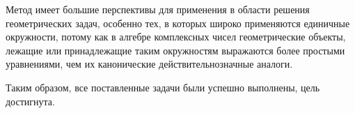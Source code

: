 Метод имеет большие перспективы для применения в области решения геометрических
задач, особенно тех, в которых широко применяются единичные окружности, потому как в алгебре
комплексных чисел геометрические объекты, лежащие или принадлежащие таким окружностям выражаются
более простыми уравнениями, чем их канонические действительнозначные аналоги.

Таким образом, все поставленные задачи были успешно выполнены, цель
достигнута.




